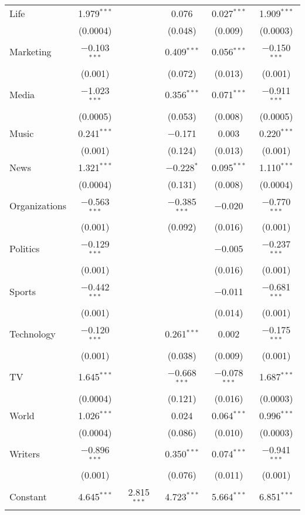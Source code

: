 \begin{table}[!htbp]
\begin{tabular}{@{\extracolsep{5pt}}lccccc}
  Life & 1.979$^{***}$ &  & 0.076 & 0.027$^{***}$ & 1.909$^{***}$ \\ 
  & (0.0004) &  & (0.048) & (0.009) & (0.0003) \\ 
  Marketing & $-$0.103$^{***}$ &  & 0.409$^{***}$ & 0.056$^{***}$ & $-$0.150$^{***}$ \\ 
  & (0.001) &  & (0.072) & (0.013) & (0.001) \\ 
  Media & $-$1.023$^{***}$ &  & 0.356$^{***}$ & 0.071$^{***}$ & $-$0.911$^{***}$ \\ 
  & (0.0005) &  & (0.053) & (0.008) & (0.0005) \\ 
  Music & 0.241$^{***}$ &  & $-$0.171 & 0.003 & 0.220$^{***}$ \\ 
  & (0.001) &  & (0.124) & (0.013) & (0.001) \\ 
  News & 1.321$^{***}$ &  & $-$0.228$^{*}$ & 0.095$^{***}$ & 1.110$^{***}$ \\ 
  & (0.0004) &  & (0.131) & (0.008) & (0.0004) \\ 
  Organizations & $-$0.563$^{***}$ &  & $-$0.385$^{***}$ & $-$0.020 & $-$0.770$^{***}$ \\ 
  & (0.001) &  & (0.092) & (0.016) & (0.001) \\ 
  Politics & $-$0.129$^{***}$ &  &  & $-$0.005 & $-$0.237$^{***}$ \\ 
  & (0.001) &  &  & (0.016) & (0.001) \\ 
  Sports & $-$0.442$^{***}$ &  &  & $-$0.011 & $-$0.681$^{***}$ \\ 
  & (0.001) &  &  & (0.014) & (0.001) \\ 
  Technology & $-$0.120$^{***}$ &  & 0.261$^{***}$ & 0.002 & $-$0.175$^{***}$ \\ 
  & (0.001) &  & (0.038) & (0.009) & (0.001) \\ 
  TV & 1.645$^{***}$ &  & $-$0.668$^{***}$ & $-$0.078$^{***}$ & 1.687$^{***}$ \\ 
  & (0.0004) &  & (0.121) & (0.016) & (0.0003) \\ 
  World & 1.026$^{***}$ &  & 0.024 & 0.064$^{***}$ & 0.996$^{***}$ \\ 
  & (0.0004) &  & (0.086) & (0.010) & (0.0003) \\ 
  Writers & $-$0.896$^{***}$ &  & 0.350$^{***}$ & 0.074$^{***}$ & $-$0.941$^{***}$ \\ 
  & (0.001) &  & (0.076) & (0.011) & (0.001) \\ 
  Constant & 4.645$^{***}$ & 2.815$^{***}$ & 4.723$^{***}$ & 5.664$^{***}$ & 6.851$^{***}$ \\ 

\end{tabular}
\end{table}

